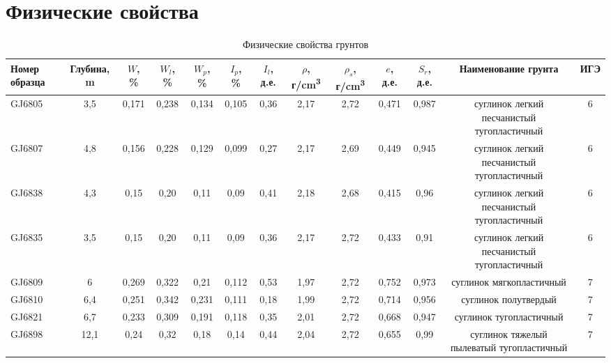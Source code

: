 \chapter{Физические свойства}\label{app:phisics}

\begin{sidewaystable}[p]
    \centering
    \small
    \caption{Физические свойства грунтов}
    \begin{tabular}{@{}lcccccccccccc@{}}
    \hline
    Номер   образца & Глубина, \si{\meter} & $W$, \% & $W_l$, \% & $W_p$, \% & $I_p$, \% & $I_l$, д.е. & $\rho$, г/\si{\centi\meter^3} & $\rho_s$, г/\si{\centi\meter^3} & $e$, д.е. & $S_r$, д.е. & Наименование   грунта                        & ИГЭ \\ \hline
    GJ6805          & 3,5        & 0,171                        & 0,238  & 0,134  & 0,105  & 0,36     & 2,17     & 2,72      & 0,471   & 0,987    & суглинок легкий   песчанистый тугопластичный & 6   \\ \hline
    GJ6807          & 4,8        & 0,156                        & 0,228  & 0,129  & 0,099  & 0,27     & 2,17     & 2,69      & 0,449   & 0,945    & суглинок легкий   песчанистый тугопластичный & 6   \\ \hline
    GJ6838          & 4,3        & 0,15                         & 0,20   & 0,11   & 0,09   & 0,41     & 2,18     & 2,68      & 0,415   & 0,96     & суглинок легкий   песчанистый тугопластичный & 6   \\ \hline
    GJ6835          & 3,5        & 0,15                         & 0,20   & 0,11   & 0,09   & 0,36     & 2,17     & 2,72      & 0,433   & 0,91     & суглинок легкий   песчанистый тугопластичный & 6   \\ \hline
    GJ6809          & 6          & 0,269                        & 0,322  & 0,21   & 0,112  & 0,53     & 1,97     & 2,72      & 0,752   & 0,973    & суглинок   мягкопластичный                   & 7   \\ \hline
    GJ6810          & 6,4        & 0,251                        & 0,342  & 0,231  & 0,111  & 0,18     & 1,99     & 2,72      & 0,714   & 0,956    & суглинок полутвердый                         & 7   \\ \hline
    GJ6821          & 6,7        & 0,233                        & 0,309  & 0,191  & 0,118  & 0,35     & 2,01     & 2,72      & 0,668   & 0,947    & суглинок   тугопластичный                    & 7   \\ \hline
    GJ6898          & 12,1       & 0,24                         & 0,32   & 0,18   & 0,14   & 0,44     & 2,04     & 2,72      & 0,655   & 0,99     & суглинок тяжелый   пылеватый тугопластичный  & 7   \\ \hline

\end{tabular}
\end{sidewaystable}
